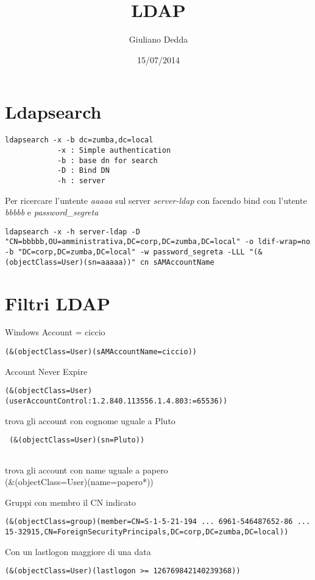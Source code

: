 \documentclass[]{article}
\title{LDAP}
\author{Giuliano Dedda}
\date{15/07/2014}
\begin{document}
\maketitle

\section{Ldapsearch}\label{ldapsearch}

\begin{verbatim}
ldapsearch -x -b dc=zumba,dc=local
            -x : Simple authentication
            -b : base dn for search
            -D : Bind DN
            -h : server
\end{verbatim}

Per ricercare l'untente \emph{aaaaa} sul server \emph{server-ldap} con
facendo bind con l'utente \emph{bbbbb} e \emph{password\_segreta}

\begin{verbatim}
ldapsearch -x -h server-ldap -D "CN=bbbbb,OU=amministrativa,DC=corp,DC=zumba,DC=local" -o ldif-wrap=no -b "DC=corp,DC=zumba,DC=local" -w password_segreta -LLL "(&(objectClass=User)(sn=aaaaa))" cn sAMAccountName 
\end{verbatim}

\section{Filtri LDAP}\label{filtri-ldap}

Windows Account = ciccio

\begin{verbatim}
(&(objectClass=User)(sAMAccountName=ciccio))
\end{verbatim}

Account Never Expire

\begin{verbatim}
(&(objectClass=User)(userAccountControl:1.2.840.113556.1.4.803:=65536)) 
\end{verbatim}

trova gli account con cognome uguale a Pluto

\begin{verbatim}
 (&(objectClass=User)(sn=Pluto))
 
\end{verbatim}

trova gli account con name uguale a papero\\
(\&(objectClass=User)(name=papero*))

Gruppi con membro il CN indicato

\begin{verbatim}
(&(objectClass=group)(member=CN=S-1-5-21-194 ... 6961-546487652-86 ... 15-32915,CN=ForeignSecurityPrincipals,DC=corp,DC=zumba,DC=local))
\end{verbatim}

Con un lastlogon maggiore di una data

\begin{verbatim}
(&(objectClass=User)(lastlogon >= 126769842140239368))
\end{verbatim}
\end{document}
